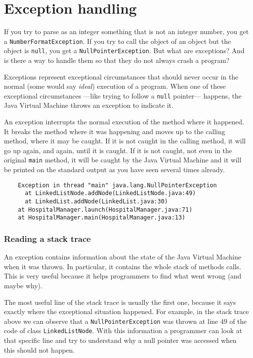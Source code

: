 
\section{Exception handling}
\label{sec:exception-handling}

If you try to parse as an integer something that is not an integer
number, you get a \verb+NumberFormatException+. If you try to call the
object of an object but the object is \verb+null+, you get a
\verb+NullPointerException+. But what are exceptions? And is there a
way to handle them so that they do not always crash a program? 

Exceptions represent exceptional circumstances that should never occur
in the normal (some would say \emph{ideal}) execution of a
program. When one of these exceptional circumstances ---like trying to
follow a \verb+null+ pointer--- happens, the Java Virtual Machine
throws an exception to indicate it. 

An exception interrupts the normal execution of the method where it
happened. It breaks the method where it was happening and moves up to
the calling method, where it may be caught. If it is not caught in the
calling method, it will go up again, and again, until it is caught. If
it is not caught, not even in the original \verb+main+ method, it will
be caught by the Java Virtual Machine and it will be printed on the
standard output as you have seen several times already. 

\begin{verbatim}
    Exception in thread "main" java.lang.NullPointerException
      at LinkedListNode.addNode(LinkedListNode.java:49)
      at LinkedList.addNode(LinkedList.java:30)
	at HospitalManager.launch(HospitalManager.java:71)
	at HospitalManager.main(HospitalManager.java:13)
\end{verbatim}

\subsubsection*{Reading a stack trace}

An exception contains information about the state of the Java Virtual
Machine when it was thrown. In particular, it contains the whole stack
of methods calls. This is very useful because it helps programmers to
find what went wrong (and maybe why). 

The most useful line of the stack trace is usually the first one,
because it says exactly where the exceptional situation happened. For
example, in the stack trace above we can observe that a
\verb+NullPointerException+ was thrown at line 49 of the code of class 
\verb+LinkedListNode+. With this information a programmer can look at
that specific line and try to understand why a null pointer was
accessed when this should not happen. 

